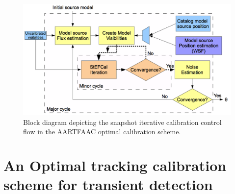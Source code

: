 \documentclass{aa}
\begin{document}
\begin{figure}[tbh]
\includegraphics[width=1\columnwidth]{Figs/Fig2_blkdiag}
\caption{Block diagram depicting the snapshot
iterative calibration control flow in the AARTFAAC optimal calibration
scheme. }
\label{fig:Block-diagram-depicting}
\end{figure}

\section{\label{sec:An-Optimal,-tracking}An Optimal tracking calibration
scheme for transient detection}
\end{document}

